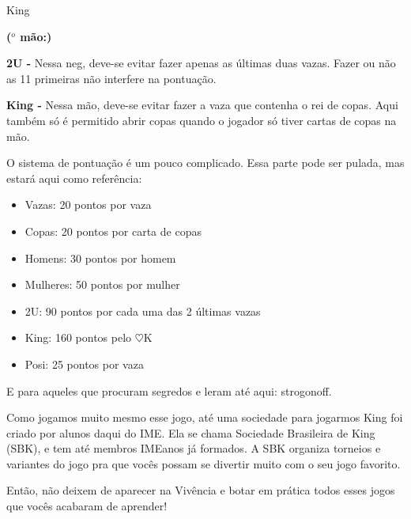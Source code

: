 \begin{subsecao}{King}
\begin{list}{\textbf{ ($^{o}$ mão:)}}{}
\item \textbf{2U -} Nessa neg, deve-se evitar fazer apenas as últimas duas
vazas. Fazer ou não as 11 primeiras não interfere na pontuação.

\item \textbf{King -} Nessa mão, deve-se evitar fazer a vaza que contenha o rei
de copas. Aqui também só é permitido abrir copas quando o jogador só tiver
cartas de copas na mão.

\end{list}

O sistema de pontuação é um pouco complicado. Essa parte pode ser pulada, mas
estará aqui como referência:
\begin{itemize}

\item Vazas:	  20 pontos por vaza
\item Copas:	  20 pontos por carta de copas
\item Homens:	  30 pontos por homem
\item Mulheres: 50 pontos por mulher
\item 2U:	  90 pontos por cada uma das 2 últimas vazas
\item King:    160 pontos pelo $\heartsuit$K
\item Posi:	  25 pontos por vaza

\end{itemize}

E para aqueles que procuram segredos e leram até aqui: strogonoff.

Como jogamos muito mesmo esse jogo, até uma sociedade para jogarmos King foi
criado por alunos daqui do IME. Ela se chama Sociedade Brasileira de King (SBK),
e tem até membros IMEanos já formados. A SBK organiza torneios e variantes do
jogo pra que vocês possam se divertir muito com o seu jogo favorito.

Então, não deixem de aparecer na Vivência e botar em prática todos esses jogos
que vocês acabaram de aprender!

\end{subsecao}
